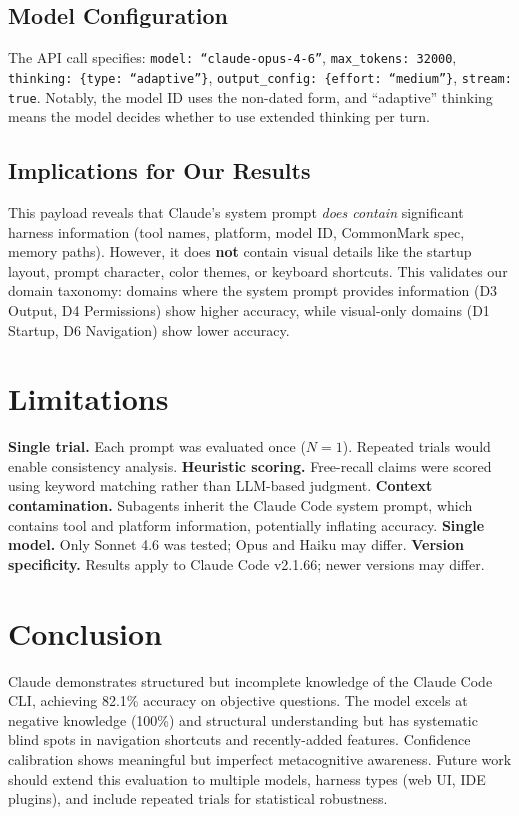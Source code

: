 \documentclass[10pt,twocolumn]{article}
\begin{document}
\subsection{Model Configuration}
The API call specifies: \texttt{model: ``claude-opus-4-6''}, \texttt{max\_tokens: 32000}, \texttt{thinking: \{type: ``adaptive''\}}, \texttt{output\_config: \{effort: ``medium''\}}, \texttt{stream: true}.
Notably, the model ID uses the non-dated form, and ``adaptive'' thinking means the model decides whether to use extended thinking per turn.

\subsection{Implications for Our Results}
This payload reveals that Claude's system prompt \textit{does contain} significant harness information (tool names, platform, model ID, CommonMark spec, memory paths).
However, it does \textbf{not} contain visual details like the startup layout, prompt character, color themes, or keyboard shortcuts.
This validates our domain taxonomy: domains where the system prompt provides information (D3 Output, D4 Permissions) show higher accuracy, while visual-only domains (D1 Startup, D6 Navigation) show lower accuracy.

\section{Limitations}

\textbf{Single trial.} Each prompt was evaluated once ($N{=}1$). Repeated trials would enable consistency analysis.
\textbf{Heuristic scoring.} Free-recall claims were scored using keyword matching rather than LLM-based judgment.
\textbf{Context contamination.} Subagents inherit the Claude Code system prompt, which contains tool and platform information, potentially inflating accuracy.
\textbf{Single model.} Only Sonnet 4.6 was tested; Opus and Haiku may differ.
\textbf{Version specificity.} Results apply to Claude Code v2.1.66; newer versions may differ.

\section{Conclusion}

Claude demonstrates structured but incomplete knowledge of the Claude Code CLI, achieving 82.1\% accuracy on objective questions.
The model excels at negative knowledge (100\%) and structural understanding but has systematic blind spots in navigation shortcuts and recently-added features.
Confidence calibration shows meaningful but imperfect metacognitive awareness.
Future work should extend this evaluation to multiple models, harness types (web UI, IDE plugins), and include repeated trials for statistical robustness.
\end{document}
